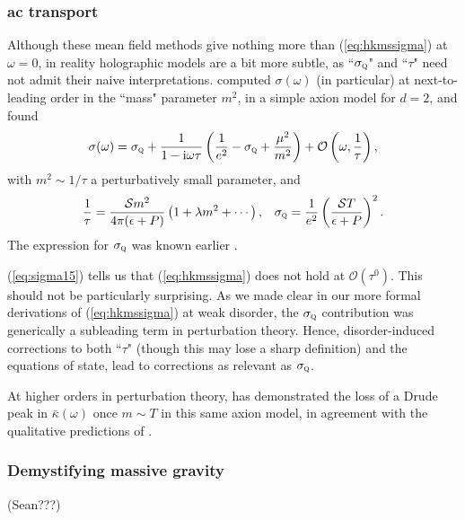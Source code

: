 \documentclass[10pt, oneside]{book}
\begin{document}
\begin{doublespace}
\subsubsection{ac transport}
\label{sec:562}
Although these mean field methods give nothing more than (\ref{eq:hkmssigma}) at $\omega=0$,  in reality holographic models are a bit more subtle, as ``$\sigma_{\textsc{q}}$" and ``$\tau$" need not admit their naive interpretations.   \cite{Davison:2015bea, Blake:2015epa} computed $\sigma(\omega)$ (in particular) at next-to-leading order in the ``mass" parameter $m^2$, in a simple axion model for $d=2$, and found \begin{equation}
\sigma(\omega) = \sigma_{\textsc{q}} + \frac{1}{1-\mathrm{i}\omega \tau} \left(\frac{1}{e^2}-\sigma_{\textsc{q}} + \frac{\mu^2}{m^2}\right) + \mathcal{O}\left(\omega, \frac{1}{\tau}\right),   \label{eq:sigma15}
\end{equation}
with $m^2 \sim 1/\tau$ a perturbatively small parameter, and \begin{equation}
\frac{1}{\tau} = \frac{\mathcal{S}m^2}{4\pi (\epsilon+P)} \left(1+\lambda m^2 + \cdots\right), \;\;\; \sigma_{\textsc{q}} = \frac{1}{e^2}\left(\frac{\mathcal{S}T}{\epsilon+P}\right)^2.
\end{equation}
The expression for $\sigma_{\textsc{q}}$ was known earlier \cite{Hartnoll:2007ip}.   

(\ref{eq:sigma15}) tells us that (\ref{eq:hkmssigma}) does not hold at $\mathcal{O}(\tau^0)$.   This should not be particularly surprising.   As we made clear in our more formal derivations of (\ref{eq:hkmssigma}) at weak disorder, the $\sigma_{\textsc{q}}$ contribution was generically a subleading term in perturbation theory.   Hence, disorder-induced corrections to both ``$\tau$" (though this may lose a sharp definition) and the equations of state, lead to corrections as relevant as $\sigma_{\textsc{q}}$.  

At higher orders in perturbation theory, \cite{Davison:2014lua} has demonstrated the loss of a Drude peak in $\bar\kappa(\omega)$ once $m\sim T$ in this same axion model, in agreement with the qualitative predictions of \cite{Hartnoll:2014lpa}.    

\subsubsection{Demystifying massive gravity}
 (Sean???)
 

\end{doublespace}
\end{document}
